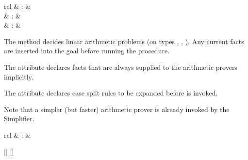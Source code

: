 \begin{isabellebody}
\begin{isamarkuptext}
\begin{description}
  \end{description}%
\end{isamarkuptext}%
\isamarkuptrue%
%
\isamarkuptrue%
%
\begin{isamarkuptext}%
\begin{matharray}{rcl}
    \hypertarget{method.HOL.arith}{\hyperlink{method.HOL.arith}{\mbox{}}} & : &  \\
    \hypertarget{attribute.HOL.arith}{\hyperlink{attribute.HOL.arith}{\mbox{}}} & : &  \\
    \hypertarget{attribute.HOL.arith-split}{\hyperlink{attribute.HOL.arith-split}{\mbox{}}} & : &  \\
  \end{matharray}

  The \hyperlink{method.HOL.arith}{\mbox{}} method decides linear arithmetic problems
  (on types , , ).  Any current
  facts are inserted into the goal before running the procedure.

  The \hyperlink{attribute.HOL.arith}{\mbox{}} attribute declares facts that are
  always supplied to the arithmetic provers implicitly.

  The \hyperlink{attribute.HOL.arith-split}{\mbox{}} attribute declares case split
  rules to be expanded before \hyperlink{method.HOL.arith}{\mbox{}} is invoked.

  Note that a simpler (but faster) arithmetic prover is
  already invoked by the Simplifier.%
\end{isamarkuptext}%
\isamarkuptrue%
%
\isamarkuptrue%
%
\begin{isamarkuptext}%
\begin{matharray}{rcl}
    \hypertarget{method.HOL.iprover}{\hyperlink{method.HOL.iprover}{\mbox{}}} & : &  \\
  \end{matharray}

  \begin{railoutput}
[]
\rail@plus
{}
[]
\rail@endplus
\rail@end
\end{railoutput}



\end{isamarkuptext}
\end{isabellebody}
